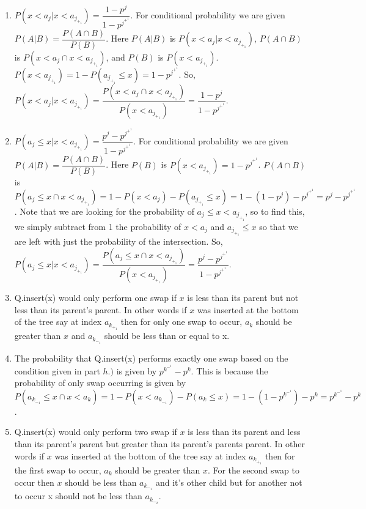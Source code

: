 \documentclass{article}
\begin{document}
\begin{enumerate}[label=(\alph*)]
\item $P(x < a_j | x < a_j_+_1) = \dfrac{1-p^j}{1 - p^j^+^1}$. For conditional probability we are given $P(A|B) = \dfrac{P(A \cap B)}{P(B)}$. Here $P(A|B)$ is $P(x < a_j | x < a_j_+_1)$, $P(A \cap B)$ is $P(x < a_j \cap x < a_j_+_1)$, and $P(B)$ is $P (x < a_j_+_1)$. $P(x < a_j_+_1) = 1 - P(a_j_+_1 \leq x) = 1 - p^j^+^1$. So, $P(x < a_j | x < a_j_+_1) = \dfrac{P(x < a_j \cap x < a_j_+_1)}{P(x < a_j_+_1)} = \dfrac{1-p^j}{1 - p^j^+^1}$.


\item $P(a_j \leq x | x < a_j_+_1) = \dfrac{p^j - p^j^+^1}{1 - p^j^+^1}$. For conditional probability we are given $P(A|B) = \dfrac{P(A \cap B)}{P(B)}$. Here $P(B)$ is $P(x < a_j_+_1) = 1 - p^j^+^1$. $P(A \cap B)$ is $P(a_j \leq x \cap x < a_j_+_1) = 1 - P(x < a_j) - P(a_j_+_1 \leq x) = 1 - (1 - p^j) - p^j^+^1 = p^j - p^j^+^1$. Note that we are looking for the probability of $a_j \leq x < a_j_+_1$, so to find this, we simply subtract from 1 the probability of $x < a_j$ and $a_j_+_1 \leq x$ so that we are left with just the probability of the intersection. So,  $P(a_j \leq x | x < a_j_+_1) = \dfrac{P(a_j \leq x \cap x < a_j_+_1)}{P(x < a_j_+_1)} = \dfrac{p^j - p^j^+^1}{1 - p^j^+^1}$.  

\item
Q.insert(x) would only perform one swap if $x$ is less than its parent but not less than its parent's parent. In other words if $x$ was inserted at the bottom of the tree say at index $a_k_+_1$ then for only one swap to occur, $a_k$ should be greater than $x$ and $a_k_-_1$ should be less than or equal to x.

\item The probability that Q.insert(x) performs exactly one swap based on the condition given in part $h.)$ is given by $p^k^-^1 - p^k$. This is because the probability of only swap occurring is given by $P(a_k_-_1 \leq x \cap x < a_k) = 1 - P(x < a_k_-_1) - P(a_k \leq x) = 1 - (1 - p^k^-^1) - p^k = p^k^-^1 - p^k$.

\item
Q.insert(x) would only perform two swap if $x$ is less than its parent and less than its parent's parent but greater than its parent's parents parent. In other words if $x$ was inserted at the bottom of the tree say at index $a_k_+_1$ then for the first swap to occur, $a_k$ should be greater than $x$. For the second swap to occur then $x$ should be less than $a_k_-_1$ and it's other child but for another not to occur x should not be less than $a_k_-_2$. 


\end{enumerate}
\end{document}
